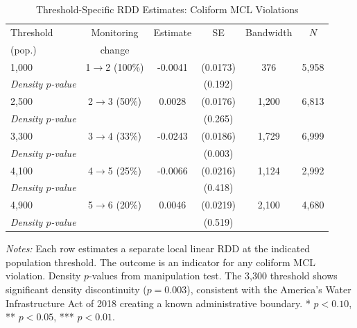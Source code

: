 \begin{table}[H]
\centering
\caption{Threshold-Specific RDD Estimates: Coliform MCL Violations}
\begin{threeparttable}
\begin{tabular}{lccccc}
\toprule
Threshold & Monitoring & Estimate & SE & Bandwidth & $N$ \\
(pop.) & change & & & & \\
\midrule
1,000 & 1$\to$2 (100\%) & -0.0041 & (0.0173) & 376 & 5,958 \\
\quad \textit{Density $p$-value} & & & (0.192) & & \\
2,500 & 2$\to$3 (50\%) & 0.0028 & (0.0176) & 1,200 & 6,813 \\
\quad \textit{Density $p$-value} & & & (0.265) & & \\
3,300 & 3$\to$4 (33\%) & -0.0243 & (0.0186) & 1,729 & 6,999 \\
\quad \textit{Density $p$-value} & & & (0.003) & & \\
4,100 & 4$\to$5 (25\%) & -0.0066 & (0.0216) & 1,124 & 2,992 \\
\quad \textit{Density $p$-value} & & & (0.418) & & \\
4,900 & 5$\to$6 (20\%) & 0.0046 & (0.0219) & 2,100 & 4,680 \\
\quad \textit{Density $p$-value} & & & (0.519) & & \\
\bottomrule
\end{tabular}
\begin{tablenotes}[flushleft]
\small
\item \textit{Notes:} Each row estimates a separate local linear RDD at the indicated population threshold. The outcome is an indicator for any coliform MCL violation. Density $p$-values from \citet{cattaneo2020simple} manipulation test. The 3,300 threshold shows significant density discontinuity ($p=0.003$), consistent with the America's Water Infrastructure Act of 2018 creating a known administrative boundary. * $p<0.10$, ** $p<0.05$, *** $p<0.01$.
\end{tablenotes}
\end{threeparttable}
\label{tab:threshold}
\end{table}
